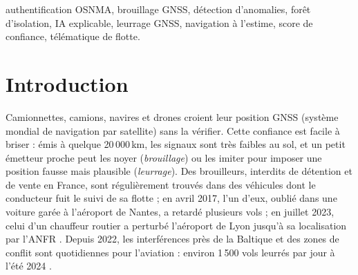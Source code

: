 \documentclass[conference]{IEEEtran}
\begin{document}
\begin{IEEEkeywords}
authentification OSNMA, brouillage GNSS, détection d'anomalies, forêt d'isolation, IA explicable, leurrage GNSS, navigation à l'estime, score de confiance, télématique de flotte.
\end{IEEEkeywords}

\section{Introduction}
Camionnettes, camions, navires et drones croient leur position GNSS (système mondial de navigation par satellite) sans la vérifier. Cette confiance est facile à briser : émis à quelque 20\,000\,km, les signaux sont très faibles au sol, et un petit émetteur proche peut les noyer (\emph{brouillage}) ou les imiter pour imposer une position fausse mais plausible (\emph{leurrage}). Des brouilleurs, interdits de détention et de vente en France, sont régulièrement trouvés dans des véhicules dont le conducteur fuit le suivi de sa flotte \cite{anfr2024} ; en avril 2017, l'un d'eux, oublié dans une voiture garée à l'aéroport de Nantes, a retardé plusieurs vols \cite{rntf2017} ; en juillet 2023, celui d'un chauffeur routier a perturbé l'aéroport de Lyon jusqu'à sa localisation par l'ANFR \cite{transinfo2023}. Depuis 2022, les interférences près de la Baltique et des zones de conflit sont quotidiennes pour l'aviation : environ 1\,500 vols leurrés par jour à l'été 2024 \cite{eucouncil2025,opsgroup2024}.
\end{document}

